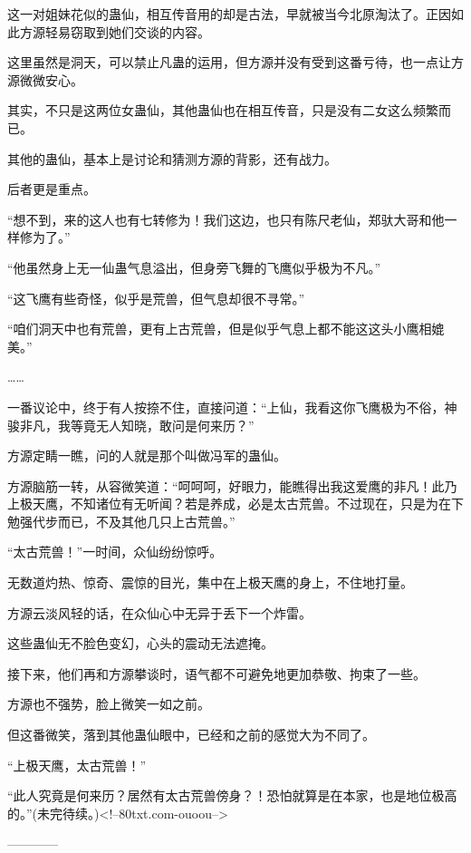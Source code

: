 \begin{this_body}
这一对姐妹花似的蛊仙，相互传音用的却是古法，早就被当今北原淘汰了。正因如此方源轻易窃取到她们交谈的内容。

这里虽然是洞天，可以禁止凡蛊的运用，但方源并没有受到这番亏待，也一点让方源微微安心。

其实，不只是这两位女蛊仙，其他蛊仙也在相互传音，只是没有二女这么频繁而已。

其他的蛊仙，基本上是讨论和猜测方源的背影，还有战力。

后者更是重点。

“想不到，来的这人也有七转修为！我们这边，也只有陈尺老仙，郑驮大哥和他一样修为了。”

“他虽然身上无一仙蛊气息溢出，但身旁飞舞的飞鹰似乎极为不凡。”

“这飞鹰有些奇怪，似乎是荒兽，但气息却很不寻常。”

“咱们洞天中也有荒兽，更有上古荒兽，但是似乎气息上都不能这这头小鹰相媲美。”

……

一番议论中，终于有人按捺不住，直接问道：“上仙，我看这你飞鹰极为不俗，神骏非凡，我等竟无人知晓，敢问是何来历？”

方源定睛一瞧，问的人就是那个叫做冯军的蛊仙。

方源脑筋一转，从容微笑道：“呵呵呵，好眼力，能瞧得出我这爱鹰的非凡！此乃上极天鹰，不知诸位有无听闻？若是养成，必是太古荒兽。不过现在，只是为在下勉强代步而已，不及其他几只上古荒兽。”

“太古荒兽！”一时间，众仙纷纷惊呼。

无数道灼热、惊奇、震惊的目光，集中在上极天鹰的身上，不住地打量。

方源云淡风轻的话，在众仙心中无异于丢下一个炸雷。

这些蛊仙无不脸色变幻，心头的震动无法遮掩。

接下来，他们再和方源攀谈时，语气都不可避免地更加恭敬、拘束了一些。

方源也不强势，脸上微笑一如之前。

但这番微笑，落到其他蛊仙眼中，已经和之前的感觉大为不同了。

“上极天鹰，太古荒兽！”

“此人究竟是何来历？居然有太古荒兽傍身？！恐怕就算是在本家，也是地位极高的。”(未完待续。)<!--80txt.com-ouoou-->

------------

\end{this_body}

